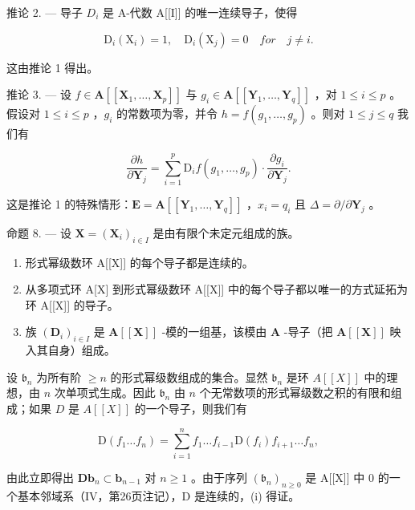 推论 2. --- 导子 \(D_{i}\) 是 A-代数 A{[}{[}I{]}{]} 的唯一连续导子，使得

\[
\mathrm{D} _ {i} (\mathrm{X} _ {i}) = 1, \quad \mathrm{D} _ {i} (\mathrm{X} _ {j}) = 0 \quad f o r \quad j \neq i.\tag{18}
\]

这由推论 1 得出。

推论 3. --- 设 \(f \in \mathbf{A}[[\mathbf{X}_1, \ldots, \mathbf{X}_p]]\) 与 \(g_i \in \mathbf{A}[[\mathbf{Y}_1, \ldots, \mathbf{Y}_q]]\) ，对 \(1 \leqslant i \leqslant p\) 。假设对 \(1 \leqslant i \leqslant p\) ，\(g_i\) 的常数项为零，并令 \(h = f(g_1, \ldots, g_p)\) 。则对 \(1 \leqslant j \leqslant q\) 我们有

\[
\frac {\partial h}{\partial \mathbf {Y} _ {j}} = \sum_ {i = 1} ^ {p} \mathrm{D} _ {i} f (g _ {1}, \dots , g _ {p}) \cdot \frac {\partial g _ {i}}{\partial \mathbf {Y} _ {j}}.\tag{19}
\]

这是推论 1 的特殊情形：\(\mathbf{E} = \mathbf{A}[[\mathbf{Y}_1,\dots ,\mathbf{Y}_q]]\) ，\(x_{i} = q_{i}\) 且 \(\Delta = \partial /\partial \mathbf{Y}_j\) 。

命题 8. --- 设 \(\mathbf{X} = (\mathbf{X}_i)_{i\in I}\) 是由有限个未定元组成的族。

\begin{enumerate}
\def\labelenumi{(\roman{enumi})}
\item
  形式幂级数环 A{[}{[}X{]}{]} 的每个导子都是连续的。
\item
  从多项式环 A{[}X{]} 到形式幂级数环 A{[}{[}X{]}{]} 中的每个导子都以唯一的方式延拓为环 A{[}{[}X{]}{]} 的导子。
\item
  族 \((\mathbf{D}_i)_{i\in I}\) 是 \(\mathbf{A}[[\mathbf{X}]]\) -模的一组基，该模由 \(\mathbf{A}\) -导子（把 \(\mathbf{A}[[\mathbf{X}]]\) 映入其自身）组成。
\end{enumerate}

设 \(\mathfrak{b}_n\) 为所有阶 \(\geqslant n\) 的形式幂级数组成的集合。显然 \(\mathfrak{b}_n\) 是环 \(A[[X]]\) 中的理想，由 \(n\) 次单项式生成。因此 \(\mathfrak{b}_n\) 由 \(n\) 个无常数项的形式幂级数之积的有限和组成；如果 \(D\) 是 \(A[[X]]\) 的一个导子，则我们有

\[
\mathrm{D} (f _ {1} \dots f _ {n}) = \sum_ {i = 1} ^ {n} f _ {1} \dots f _ {i - 1} \mathrm{D} (f _ {i}) f _ {i + 1} \dots f _ {n},
\]

由此立即得出 \(\mathbf{Db}_{n} \subset \mathbf{b}_{n-1}\) 对 \(n \geqslant 1\) 。由于序列 \((\mathfrak{b}_n)_{n \geqslant 0}\) 是 A{[}{[}X{]}{]} 中 0 的一个基本邻域系（IV，第26页注记），D 是连续的，(i) 得证。

